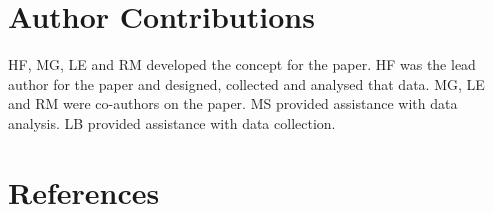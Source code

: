 \documentclass[
  english,
  man,floatsintext]{apa6}
\begin{document}
\hypertarget{author-contributions}{%
\section{Author Contributions}\label{author-contributions}}

HF, MG, LE and RM developed the concept for the paper. HF was the lead author for the paper and designed, collected and analysed that data. MG, LE and RM were co-authors on the paper. MS provided assistance with data analysis. LB provided assistance with data collection.

\hypertarget{references}{%
\section{References}\label{references}}

\begingroup
\setlength{\parindent}{-0.5in}
\setlength{\leftskip}{0.5in}
\end{document}
